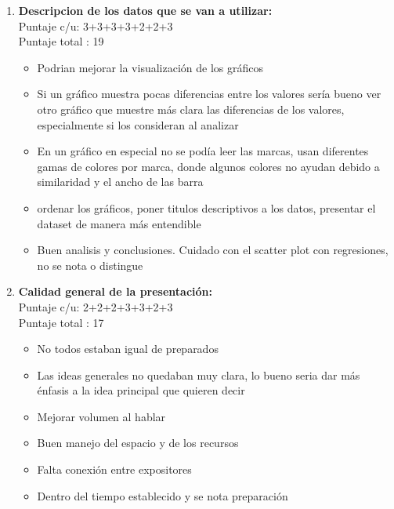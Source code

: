 \documentclass[letterpaper,10.7pt]{article}
\begin{document}
\begin{enumerate}
\item \textbf{Descripcion de los datos que se van a utilizar:}\\
Puntaje c/u: 3+3+3+3+2+2+3\\
Puntaje total : 19\\
\begin{itemize}
	\item Podrian mejorar la visualización de los gráficos
	\item Si un gráfico muestra pocas diferencias entre los valores sería bueno ver otro gráfico que muestre más clara las diferencias de los valores, especialmente si los consideran al analizar
	\item En un gráfico en especial no se podía leer las marcas, usan diferentes gamas de colores por marca, donde algunos colores no ayudan debido a similaridad y el ancho de las barra
	\item ordenar los gráficos, poner titulos descriptivos a los datos, presentar el dataset de manera más entendible
	\item Buen analisis y conclusiones. Cuidado con el scatter plot con regresiones, no se nota o distingue
\end{itemize}


\item \textbf{Calidad general de la presentación:}\\
Puntaje c/u: 2+2+2+3+3+2+3\\
Puntaje total : 17
\begin{itemize}
	\item No todos estaban igual de preparados
	\item Las ideas generales no quedaban muy clara, lo bueno seria dar más énfasis a la idea principal que quieren decir
	\item Mejorar volumen al hablar
	\item Buen manejo del espacio y de los recursos
	\item Falta conexión entre expositores
	\item Dentro del tiempo establecido y se nota preparación
\end{itemize}

\end{enumerate}
\end{document}
